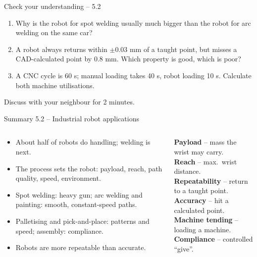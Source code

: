 \documentclass[aspectratio=169,10pt]{beamer}
\begin{document}
\begin{frame}[t]{Check your understanding -- 5.2}
\vspace{4mm}
\begin{keybox}
\large
\begin{enumerate}
\item Why is the robot for spot welding usually much bigger than the robot for arc welding on the same car?\\[3mm]
\item A robot always returns within $\pm$0.03 mm of a taught point, but misses a CAD-calculated point by 0.8 mm. Which property is good, which is poor?\\[3mm]
\item A CNC cycle is 60 s; manual loading takes 40 s, robot loading 10 s. Calculate both machine utilisations.
\end{enumerate}
\end{keybox}
\vfill
\centering\small\color{mkGray} Discuss with your neighbour for 2 minutes.
\end{frame}

\begin{frame}{Summary 5.2 -- Industrial robot applications}
\begin{columns}[T,onlytextwidth]
\begin{keybox}
\small
\begin{itemize}
\item About half of robots do handling; welding is next.
\item The process sets the robot: payload, reach, path quality, speed, environment.
\item Spot welding: heavy gun; arc welding and painting: smooth, constant-speed paths.
\item Palletising and pick-and-place: patterns and speed; assembly: compliance.
\item Robots are more repeatable than accurate.
\end{itemize}
\end{keybox}
\begin{defbox}
\small
\textbf{Payload} -- mass the wrist may carry.\\
\textbf{Reach} -- max.\ wrist distance.\\
\textbf{Repeatability} -- return to a taught point.\\
\textbf{Accuracy} -- hit a calculated point.\\
\textbf{Machine tending} -- loading a machine.\\
\textbf{Compliance} -- controlled ``give''.
\end{defbox}
\end{columns}
\end{frame}
\end{document}
